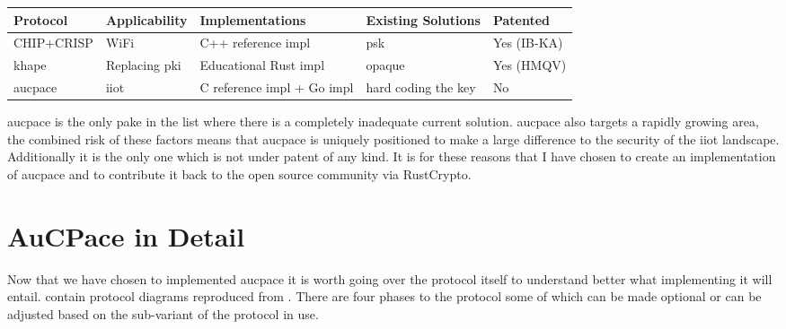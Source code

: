 \begin{center}
  \small
  \begin{tabular}{ llp{2.8cm}ll }
    \toprule
    Protocol & Applicability & Implementations & Existing Solutions & Patented \\
    \midrule
    CHIP+CRISP & WiFi & C++ reference impl & \gls{psk} & Yes (IB-KA)\\
    \gls{khape} & Replacing \gls{pki} & Educational Rust impl & \gls{opaque} & Yes (HMQV)\\
    \gls{aucpace} & \gls{iiot} & C reference impl + Go impl & hard coding the key & No\\
    \bottomrule
  \end{tabular}
\end{center}

\gls{aucpace} is the only \gls{pake} in the list where there is a completely inadequate current solution.
\gls{aucpace} also targets a rapidly growing area, the combined risk of these factors means that \gls{aucpace} is uniquely positioned to make a large difference to the security of the \gls{iiot} landscape.
Additionally it is the only one which is not under patent of any kind.
It is for these reasons that I have chosen to create an implementation of \gls{aucpace} and to contribute it back to the open source community via RustCrypto.

\section{AuCPace in Detail}
Now that we have chosen to implemented \gls{aucpace} it is worth going over the protocol itself to understand better what implementing it will entail.
 contain protocol diagrams reproduced from \cite{aucpace}.
There are four phases to the protocol some of which can be made optional or can be adjusted based on the sub-variant of the protocol in use.

